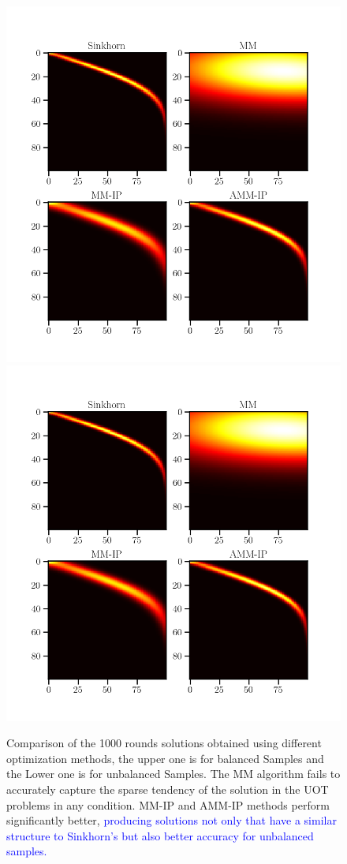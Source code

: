 \documentclass[a4paper,twocolumn]{article}
\newcommand{\changeSX}[1]{\textcolor{blue}{#1}}
\begin{document}
\begin{figure}[htbp]
\centering
\includegraphics[width = 0.99\linewidth]{pic/ex2}
\centering
\includegraphics[width = 0.99\linewidth]{pic/ex4}
\setlength{\belowcaptionskip}{-30pt}
\caption{Comparison of the 1000 rounds solutions obtained using different optimization methods, the upper one is for balanced Samples and the Lower one is for unbalanced Samples. The MM algorithm fails to accurately capture the sparse tendency of the solution in the UOT problems in any condition. MM-IP and AMM-IP methods perform significantly better,\changeSX{ producing solutions not only that have a similar structure to Sinkhorn's but also better accuracy for unbalanced samples.}}
\label{Fig:ex2}
\end{figure}
\end{document}
